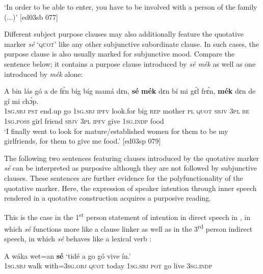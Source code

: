 \glt ‘In order to be able to enter, you have to be involved with a person 
of the family (...)’ [ed03sb 077]
\z

Different subject purpose clauses may also additionally feature the quotative marker \textit{sé} ‘\textsc{quot}’ like any other subjunctive subordinate clause. In such cases, the purpose clause is also usually marked for subjunctive mood. Compare the sentence below; it contains a purpose clause introduced by \textit{sé mék} as well as one introduced by \textit{mék} alone: 


\ea%
    \label{ex:key:1500}
    \gll A    bin  lás    gó  a    de  fɛ́n    bíg  bíg  mamá  dɛn, \textbf{sé}    \textbf{mék}  
dɛn  bí  mi    gɛ́l  frɛ́n,  \textbf{mék}    dɛn  de  gí  mi    chɔ́p.\\
\textsc{1sg.sbj}  \textsc{pst}  end.up  go  \textsc{1sg.sbj}  \textsc{ipfv}  look.for  big  \textsc{rep}  mother  \textsc{pl}  \textsc{quot}    \textsc{sbjv}
\textsc{3pl}  \textsc{be}  \textsc{1sg.poss}  girl  friend   \textsc{sbjv}    \textsc{3pl}  \textsc{ipfv}  give  \textsc{1sg.indp}  food\\
\glt ‘I finally went to look for mature/established women for them to be my girlfriends, 
for them to give me food.’ [ed03sp 079]
\z

The following two sentences featuring clauses introduced by the quotative marker \textit{sé} can be interpreted as purposive although they are not followed by subjunctive clauses. These sentences are further evidence for the polyfunctionality of the quotative marker. Here, the expression of speaker intention through inner speech rendered in a quotative construction acquires a purposive reading. 


This is the case in the 1\textsuperscript{st} person statement of intention in direct speech in , in which \textit{sé} functions more like a clause linker as well as in the 3\textsuperscript{rd} person indirect speech, in which \textit{sé} behaves like a lexical verb :



\ea%
    \label{ex:key:1501}
    \gll A    wáka  wet=an    \textbf{sé}    ‘tidé    a    go  gó  vive    ín.’\\
\textsc{1sg.sbj}  walk  with=\textsc{3sg.obj}  \textsc{quot}    today  \textsc{1sg.sbj}  \textsc{pot}  go  live    \textsc{3sg.indp}\\

